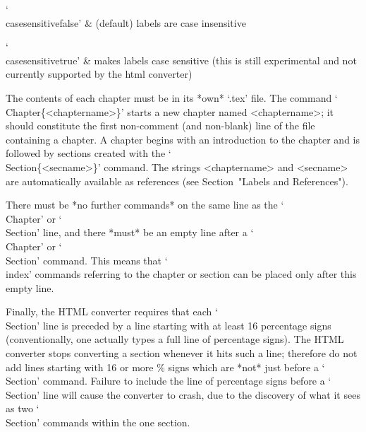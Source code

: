 `\\casesensitivefalse' & (default) labels are case insensitive

`\\casesensitivetrue' & makes labels case sensitive (this is still experimental
   and not currently supported by the html converter)

\enditems


\indextt{\\Chapter}\indextt{\\Section}
The contents of each chapter must  be  in  its  *own*  `.tex'  file.  The
command  `\\Chapter\{<chaptername>\}'  starts   a   new   chapter   named
<chaptername>; it should constitute the first non-comment (and non-blank)
line of  the  file  containing  a  chapter.  A  chapter  begins  with  an
introduction to the chapter and is followed by sections created with  the
`\\Section\{<secname>\}' command. The strings <chaptername> and <secname>
are  automatically  available  as  references  (see  Section~"Labels  and
References").

There must be *no further commands* on the same line as  the  `\\Chapter'
or  `\\Section'  line,  and  there  *must*  be  an  empty  line  after  a
`\\Chapter' or `\\Section' command. This means  that  `\\index'  commands
referring to the chapter or section can be placed only after  this  empty
line.

Finally, the HTML  converter  requires  that  each  `\\Section'  line  is
preceded  by  a  line  starting  with  at  least  16   percentage   signs
(conventionally, one actually types a full line of percentage signs). The
HTML converter stops converting a section whenever it hits such  a  line;
therefore do not add lines starting with 16 or more \%  signs  which  are
*not* just before a `\\Section' command. Failure to include the  line  of
percentage signs before a `\\Section' line will cause  the  converter  to
crash, due to the discovery of what it sees as two  `\\Section'  commands
within the one section.

